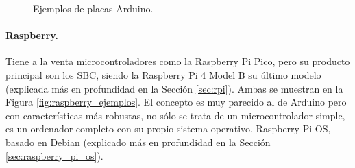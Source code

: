 \begin{figure}[h!]
  \begin{center}
    \subcapcentertrue
    \hspace{1cm}
  \end{center}
\caption{Ejemplos de placas Arduino.}
\label{fig:arduino_ejemplos}
\end{figure}

\paragraph{Raspberry.} Tiene a la venta microcontroladores como la Raspberry Pi Pico, pero su producto principal son los SBC, siendo la Raspberry Pi 4 Model B su último modelo (explicada más en profundidad en la Sección \ref{sec:rpi}). Ambas se muestran en la Figura \ref{fig:raspberry_ejemplos}. El concepto es muy parecido al de Arduino pero con características más robustas, no sólo se trata de un microcontrolador simple, es un ordenador completo con su propio sistema operativo, Raspberry Pi OS, basado en Debian (explicado más en profundidad en la Sección \ref{sec:raspberry_pi_os}). \\

